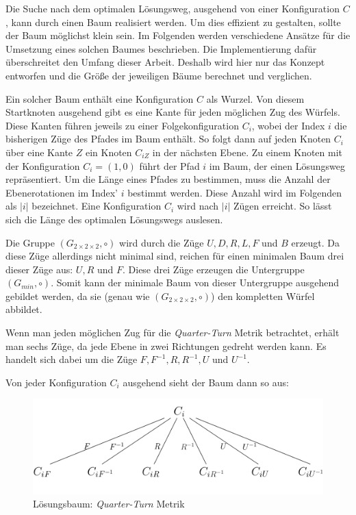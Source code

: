 \documentclass[12pt,a4paper, usenames, dvipsnames]{article}
\theoremstyle{mystyle}
\theoremstyle{definition}
\newcommand{\Gtwo}{\ensuremath{G_{2\times 2\times 2}}}
\begin{document}
Die Suche nach dem optimalen Lösungsweg, ausgehend von einer Konfiguration $C$, kann durch einen Baum realisiert werden. Um dies effizient zu gestalten, sollte der Baum möglichst klein sein. Im Folgenden werden verschiedene Ansätze für die Umsetzung eines solchen Baumes beschrieben. Die Implementierung dafür überschreitet den Umfang dieser Arbeit. Deshalb wird hier nur das Konzept entworfen und die Größe der jeweiligen Bäume berechnet und verglichen. 

Ein solcher Baum enthält eine Konfiguration $C$ als Wurzel. Von diesem Startknoten ausgehend gibt es eine Kante für jeden möglichen Zug des Würfels. Diese Kanten führen jeweils zu einer Folgekonfiguration $C_i$, wobei der Index $i$ die bisherigen Züge des Pfades im Baum enthält. So folgt dann auf jeden Knoten $C_i$ über eine Kante $Z$ ein Knoten $C_{iZ}$ in der nächsten Ebene. Zu einem Knoten mit der Konfiguration $C_i=(1,0)$ führt der Pfad $i$ im Baum, der einen Lösungsweg repräsentiert. Um die Länge eines Pfades zu bestimmen, muss die Anzahl der Ebenerotationen im Index' $i$ bestimmt werden. Diese Anzahl wird im Folgenden als $|i|$ bezeichnet. Eine Konfiguration $C_i$ wird nach $|i|$ Zügen erreicht. So lässt sich die Länge des optimalen Lösungswegs auslesen.

Die Gruppe $(\Gtwo, \circ)$ wird durch die Züge $U, D, R, L, F$ und $B$ erzeugt. Da diese Züge allerdings nicht minimal sind, reichen für einen minimalen Baum drei dieser Züge aus: $U, R$ und $F$. Diese drei Züge erzeugen die Untergruppe $(G_{min}, \circ)$. Somit kann der minimale Baum von dieser Untergruppe ausgehend gebildet werden, da sie (genau wie $(\Gtwo, \circ)$) den kompletten Würfel abbildet.

Wenn man jeden möglichen Zug für die \textit{Quarter-Turn} Metrik betrachtet, erhält man sechs Züge, da jede Ebene in zwei Richtungen gedreht werden kann. Es handelt sich dabei um die Züge $F, F^{-1}, R, R^{-1}, U$ und $U^{-1}$.

Von jeder Konfiguration $C_i$ ausgehend sieht der Baum dann so aus:

\begin{figure}[H]
\centering
\includegraphics[scale=1.3]{Baum_1.jpg}
\caption{Lösungsbaum: \textit{Quarter-Turn} Metrik}
\label{Abbildung_BaumQTM}
\end{figure}
\end{document}
